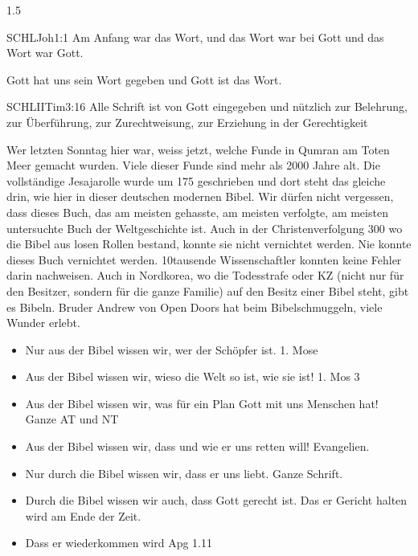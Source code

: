 \documentclass[fontsize=14pt]{../../inc/mybib}
\begin{document}
\begin{spacing}{1.5}
\begin{block}
\begin{block}
        \end{block}
        \begin{block}
        \begin{bibelbox}{SCHL}{Joh}{1:1}
        Am Anfang war das Wort, und das Wort war bei Gott und das Wort war Gott.
        \end{bibelbox}
        Gott hat uns sein Wort gegeben und Gott ist das Wort. 
        \begin{bibelbox}{SCHL}{IITim}{3:16}
        Alle Schrift ist von Gott eingegeben und nützlich zur Belehrung, zur Überführung, zur Zurechtweisung, zur Erziehung in der Gerechtigkeit
        \end{bibelbox}
        Wer letzten Sonntag hier war, weiss jetzt, welche Funde in Qumran am Toten Meer gemacht wurden. Viele dieser Funde sind mehr als 2000 Jahre alt. Die vollständige Jesajarolle \zB{} wurde um 175 \vChr{} geschrieben und dort steht das gleiche drin, wie hier in dieser deutschen modernen Bibel. Wir dürfen nicht vergessen, dass dieses Buch, das am meisten gehasste, am meisten verfolgte, am meisten untersuchte Buch der Weltgeschichte ist. Auch in der Christenverfolgung 300 \nChr{} wo die Bibel aus losen Rollen bestand, konnte sie nicht vernichtet werden. Nie konnte dieses Buch vernichtet werden. 10tausende Wissenschaftler konnten keine Fehler darin nachweisen. Auch in Nordkorea, wo die Todesstrafe oder KZ (nicht nur für den Besitzer, sondern für die ganze Familie) auf den Besitz einer Bibel steht, gibt es Bibeln. Bruder Andrew von Open Doors hat beim Bibelschmuggeln, viele Wunder erlebt.    
        \begin{itemize}
            \item Nur aus der Bibel wissen wir, wer der Schöpfer ist. 1. Mose
            \item Aus der Bibel wissen wir, wieso die Welt so ist, wie sie ist! 1. Mos 3
            \item Aus der Bibel wissen wir, was für ein Plan Gott mit uns Menschen hat! Ganze AT und NT
            \item Aus der Bibel wissen wir, dass und wie er uns retten will! Evangelien.
            \item Nur durch die Bibel wissen wir, dass er uns liebt. Ganze Schrift.
            \item Durch die Bibel wissen wir auch, dass Gott gerecht ist. Das er Gericht halten wird am Ende der Zeit.
            \item Dass er wiederkommen wird Apg 1.11

\end{itemize}
\end{block}
\end{block}
\end{spacing}
\end{document}
